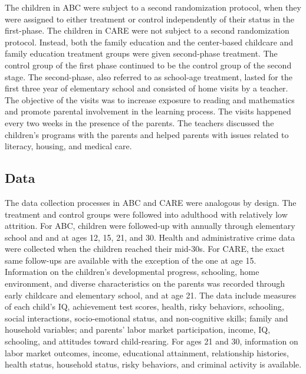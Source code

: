 \noindent The children in ABC were subject to a second randomization protocol, when they were assigned to either treatment or control independently of their status in the first-phase. The children in CARE were not subject to a second randomization protocol. Instead, both the family education and the center-based childcare and family education treatment groups were given second-phase treatment. The control group of the first phase continued to be the control group of the second stage. The second-phase, also referred to as school-age treatment, lasted for the first three year of elementary school and consisted of home visits by a teacher. The objective of the visits was to increase exposure to reading and mathematics and promote parental involvement in the learning process. The visits happened every two weeks in the presence of the parents. The teachers discussed the children's programs with the parents and helped parents with issues related to literacy, housing, and medical care.\\ 

\subsection{Data}

\noindent The data collection processes in ABC and CARE were analogous by design. The treatment and control groups were followed into adulthood with relatively low attrition. For ABC, children were followed-up with annually through elementary school and and at ages 12, 15, 21, and 30. Health and administrative crime data were collected when the children reached their mid-30s. For CARE, the exact same follow-ups are available with the exception of the one at age 15.\\

\noindent Information on the children’s developmental progress, schooling, home environment, and diverse characteristics on the parents was recorded through early childcare and elementary school, and at age 21. The data include measures of each child’s IQ, achievement test scores, health, risky behaviors, schooling, social interactions, socio-emotional status, and non-cognitive skills; family and household variables; and parents’ labor market participation, income, IQ, schooling, and attitudes toward child-rearing. For ages 21 and 30, information on labor market outcomes, income, educational attainment, relationship histories, health status, household status, risky behaviors, and criminal activity is available.\\

